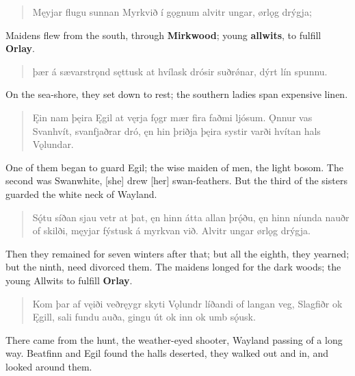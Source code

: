 \begin{verse}
\bva Męyjar flugu sunnan \hld Myrkvið í gǫgnum
alvitr ungar, \hld ørlǫg drýgja; \\%
\end{verse}

\bvb Maidens flew from the south, through \textbf{Mirkwood}; young \textbf{allwits}, to fulfill \textbf{Orlay}. \\

\begin{verse}
\bva þær á sævarstrǫnd \hld sęttusk at hvílask
drósir suðrǿnar, \hld dýrt lín spunnu. \\%
\end{verse}

\bvb On the sea-shore, they set down to rest; the southern ladies span expensive linen. \\

\begin{verse}
\bva Ęin nam þęira \hld Ęgil at vęrja
fǫgr mær fira \hld faðmi ljósum.
Ǫnnur vas Svanhvít, \hld svanfjaðrar dró,
ęn hin þriðja \hld þęira systir
varði hvítan \hld hals Vǫlundar. \\%
\end{verse}

\bvb One of them began to guard Egil; the wise maiden of men, the light bosom. The second was Swanwhite, [she] drew [her] swan-feathers. But the third of the sisters guarded the white neck of Wayland. \\

\begin{verse}
\bva Sǫ́tu síðan \hld sjau vetr at þat,
ęn hinn átta \hld allan þrǫ́ðu,
ęn hinn níunda \hld nauðr of skilði,
męyjar fýstusk \hld á myrkvan við.
Alvitr ungar \hld ørlǫg drýgja. \\%
\end{verse}

\bvb Then they remained for seven winters after that; but all the eighth, they yearned; but the ninth, need divorced them. The maidens longed for the dark woods; the young Allwits to fulfill \textbf{Orlay}. \\

\begin{verse}
\bva Kom þar af vęiði \hld veðręygr skyti
Vǫlundr líðandi \hld of langan veg,
Slagfiðr ok Ęgill, \hld sali fundu auða,
gingu út ok inn \hld ok umb sǫ́usk. \\%
\end{verse}

\bvb There came from the hunt, the weather-eyed shooter, Wayland passing of a long way. Beatfinn and Egil found the halls deserted, they walked out and in, and looked around them. \\

